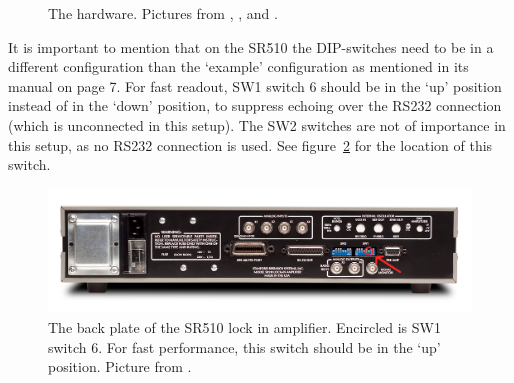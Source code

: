 \begin{figure}[h!tb]
	\begin{center}
		\qquad
		\qquad
		\caption{The hardware. Pictures from \cite{PI}, \cite{SR}, and \cite{prologix}.}
		\label{fig:hardware}
	\end{center}
\end{figure}

It is important to mention that on the SR510 the DIP-switches need to be in a different configuration than the `example' configuration as mentioned in its manual on page 7. For fast readout, SW1 switch 6 should be in the `up' position instead of in the `down' position, to suppress echoing over the RS232 connection (which is unconnected in this setup). The SW2 switches are not of importance in this setup, as no RS232 connection is used. See figure~\ref{fig:SR510_back} for the location of this switch.

\begin{figure}
 \begin{center}
  \includegraphics[width=\textwidth]{figures/SR510_Rear_circle.jpg}
  \caption{The back plate of the SR510 lock in amplifier. Encircled is SW1 switch 6. For fast performance, this switch should be in the `up' position. Picture from \cite{SR}.}
  \label{fig:SR510_back}
 \end{center}
\end{figure}


